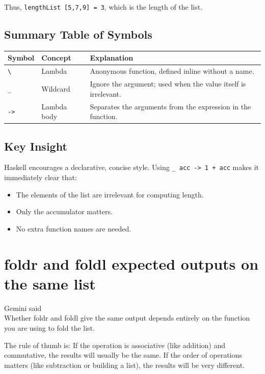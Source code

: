 \documentclass[12pt]{article}
\begin{document}
Thus, \texttt{lengthList [5,7,9] = 3}, which is the length of the list.

\subsection{Summary Table of Symbols}

\begin{tabular}{llp{7cm}}
    \textbf{Symbol}         & \textbf{Concept} & \textbf{Explanation}                                           \\
    \hline
    \texttt{\textbackslash} & Lambda           & Anonymous function, defined inline without a name.             \\
    \texttt{\_}             & Wildcard         & Ignore the argument; used when the value itself is irrelevant. \\
    \texttt{->}             & Lambda body      & Separates the arguments from the expression in the function.   \\
\end{tabular}

\subsection{Key Insight}

Haskell encourages a declarative, concise style. Using \texttt{\_ acc -> 1 + acc} makes it immediately clear that:

\begin{itemize}
    \item The elements of the list are irrelevant for computing length.
    \item Only the accumulator matters.
    \item No extra function names are needed.
\end{itemize}


\section{foldr and foldl expected outputs on the same list}

Gemini said \\
Whether foldr and foldl give the same output depends entirely on the function you are using to fold the list.

The rule of thumb is: If the operation is associative (like addition) and commutative, the results will usually be the same. If the order of operations matters (like subtraction or building a list), the results will be very different.
\end{document}
